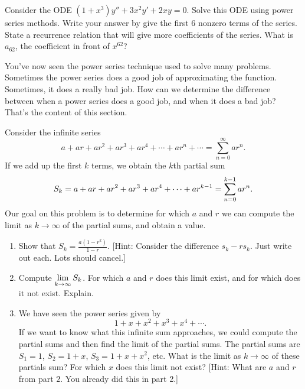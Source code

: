 \begin{problem}
 Consider the ODE $(1+x^3)y''+3x^2y'+2xy=0$. Solve this ODE using power series methods. Write your answer by give the first 6 nonzero terms of the series. State a recurrence relation that will give more coefficients of the series. What is $a_{62}$, the coefficient in front of $x^{62}$?
\end{problem}



You've now seen the power series technique used to solve many problems.  Sometimes the power series does a good job of approximating the function.  Sometimes, it does a really bad job. How can we determine the difference between when a power series does a good job, and when it does a bad job?  That's the content of this section.

\begin{problem}
 Consider the infinite series 
$$a+ar+ar^2+ar^3+ar^4+\cdots +ar^n+\cdots = \sum_{n=0}^\infty ar^n.$$
If we add up the first $k$ terms, we obtain the $k$th partial sum 
$$\displaystyle S_k = a+ar+ar^2+ar^3+ar^4+\cdots +ar^{k-1} = \sum_{n=0}^{k-1}ar^n.$$
Our goal on this problem is to determine for which $a$ and $r$ we can compute the limit as $k\to \infty$ of the partial sums, and obtain a value.  
\begin{enumerate}
 \item Show that $S_k = \frac{a(1-r^k)}{1-r}$. [Hint: Consider the difference $s_k-rs_k$. Just write out each. Lots should cancel.]
 \item Compute $\displaystyle\lim_{k\to\infty}S_k$.  For which $a$ and $r$ does this limit exist, and for which does it not exist. Explain.
 \item We have seen the power series given by  
$$1+x+x^2+x^3+x^4+\cdots.$$
 If we want to know what this infinite sum approaches, we could compute the partial sums and then find the limit of the partial sums.  The partial sums are $S_1=1$, $S_2=1+x$, $S_3=1+x+x^2$, etc. What is the limit as $k\to\infty$ of these partials sum? For which $x$ does this limit not exist? [Hint: What are $a$ and $r$ from part $2$. You already did this in part 2.]
\end{enumerate}

\end{problem}


